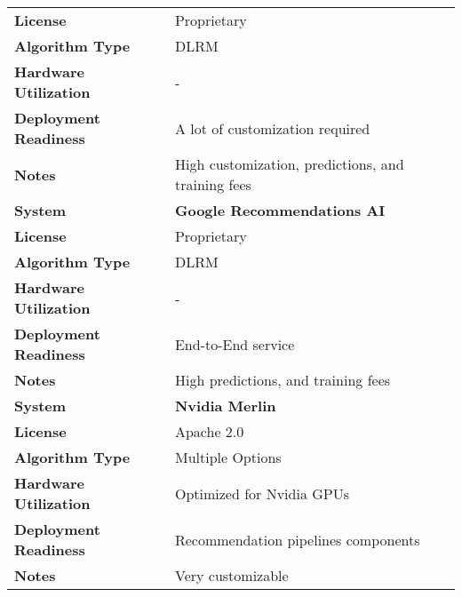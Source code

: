 \begin{table}[h]
\begin{tabular}{|l|l|}
        \cline{2-2}
        \textbf{License} & Proprietary \\
        \cline{2-2}
        \textbf{Algorithm Type} & DLRM \\
        \cline{2-2}
        \textbf{Hardware Utilization} & - \\
        \cline{2-2}
        \textbf{Deployment Readiness} & A lot of customization required  \\
        \cline{2-2}
        \textbf{Notes} & High customization, predictions, and training fees \\
        \hline
        \hline
        \textbf{System} & \textbf{Google Recommendations AI} \\
        \cline{2-2}
        \textbf{License} & Proprietary \\
        \cline{2-2}
        \textbf{Algorithm Type} & DLRM \\
        \cline{2-2}
        \textbf{Hardware Utilization} & - \\
        \cline{2-2}
        \textbf{Deployment Readiness} & End-to-End service \\
        \cline{2-2}
        \textbf{Notes} & High predictions, and training fees \\
        \hline
        \hline
        \textbf{System} & \textbf{Nvidia Merlin} \\
        \cline{2-2}
        \textbf{License} & Apache 2.0 \\
        \cline{2-2}
        \textbf{Algorithm Type} & Multiple Options  \\
        \cline{2-2}
        \textbf{Hardware Utilization} & Optimized for Nvidia GPUs \\
        \cline{2-2}
        \textbf{Deployment Readiness} & Recommendation pipelines components \\
        \cline{2-2}
        \textbf{Notes} & Very customizable \\
        \hline
    \end{tabular}
\end{table}